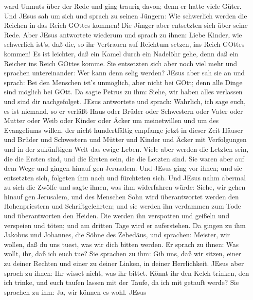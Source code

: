 ward Unmuts über der Rede und ging traurig davon; denn er hatte viele
Güter.  Und JEsus sah um sich und sprach zu seinen Jüngern:
Wie schwerlich werden die Reichen in das Reich GOttes kommen!
 Die Jünger aber entsetzten sich über seine Rede. Aber
JEsus antwortete wiederum und sprach zu ihnen: Liebe Kinder, wie
schwerlich ist's, daß die, so ihr Vertrauen auf Reichtum setzen, ins
Reich GOttes kommen!  Es ist leichter, daß ein Kamel durch
ein Nadelöhr gehe, denn daß ein Reicher ins Reich GOttes komme.
 Sie entsetzten sich aber noch viel mehr und sprachen
untereinander: Wer kann denn selig werden?  JEsus aber sah
sie an und sprach: Bei den Menschen ist's unmöglich, aber nicht bei
GOtt; denn alle Dinge sind möglich bei GOtt.  Da sagte
Petrus zu ihm: Siehe, wir haben alles verlassen und sind dir
nachgefolget.  JEsus antwortete und sprach: Wahrlich, ich
sage euch, es ist niemand, so er verläßt Haus oder Brüder oder
Schwestern oder Vater oder Mutter oder Weib oder Kinder oder Äcker um
meinetwillen und um des Evangeliums willen,  der nicht
hundertfältig empfange jetzt in dieser Zeit Häuser und Brüder und
Schwestern und Mütter und Kinder und Äcker mit Verfolgungen und in der
zukünftigen Welt das ewige Leben.  Viele aber werden die
Letzten sein, die die Ersten sind, und die Ersten sein, die die Letzten
sind.  Sie waren aber auf dem Wege und gingen hinauf gen
Jerusalem. Und JEsus ging vor ihnen; und sie entsetzten sich, folgeten
ihm nach und fürchteten sich. Und JEsus nahm abermal zu sich die Zwölfe
und sagte ihnen, was ihm widerfahren würde:  Siehe, wir
gehen hinauf gen Jerusalem, und des Menschen Sohn wird überantwortet
werden den Hohenpriestern und Schriftgelehrten; und sie werden ihn
verdammen zum Tode und überantworten den Heiden.  Die
werden ihn verspotten und geißeln und verspeien und töten; und am
dritten Tage wird er auferstehen.  Da gingen zu ihm Jakobus
und Johannes, die Söhne des Zebedäus, und sprachen: Meister, wir wollen,
daß du uns tuest, was wir dich bitten werden.  Er sprach zu
ihnen: Was wollt, ihr, daß ich euch tue?  Sie sprachen zu
ihm: Gib uns, daß wir sitzen, einer zu deiner Rechten und einer zu
deiner Linken, in deiner Herrlichkeit.  JEsus aber sprach
zu ihnen: Ihr wisset nicht, was ihr bittet. Könnt ihr den Kelch trinken,
den ich trinke, und euch taufen lassen mit der Taufe, da ich mit getauft
werde?  Sie sprachen zu ihm: Ja, wir können es wohl. JEsus
